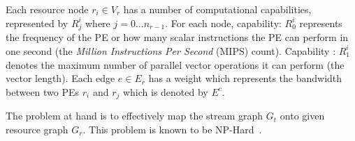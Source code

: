 \documentclass[10pt, conference, compsocconf]{IEEEtran}
\begin{document}


Each resource node $r_i \in V_r$ has a number of computational
capabilities, represented by $R^{i}_{j}$ where $j=0...n_{r-1}$.
For each node, capability: $R^i_0$ represents the frequency of the PE or
how many scalar instructions the PE can perform in one second (the
\textit{Million Instructions Per Second} (MIPS) count). Capability :
$R^i_1$ denotes the maximum number of parallel vector operations it can
perform (the vector length). Each edge $e \in E_r$ has a weight which
represents the bandwidth between two PEs $r_i$ and $r_j$ which is
denoted by $E^c$.


The problem at hand is to effectively map the stream graph $G_t$ onto
given resource graph $G_r$. This problem is known to be
NP-Hard~\cite{vsar89}. %

\end{document}
